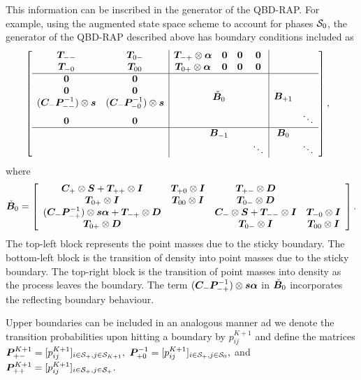 This information can be inscribed in the generator of the QBD-RAP. For example, using the augmented state space scheme to account for phases \(\mathcal{S}_0\), the generator of the QBD-RAP described above has boundary conditions included as 
\begin{align*}
&\left[\begin{array}{cc|cccc|cc}
	\bs T_{--} & \bs T_{0-} & \bs T_{-+} \otimes\bs \alpha & \bs 0 & \bs 0 & \bs 0 &&\\
	\bs T_{-0} & \bs T_{00} & \bs T_{0+} \otimes\bs \alpha & \bs 0 & \bs 0 & \bs 0 &&\\\hline
	\bs 0 & \bs 0 &\multicolumn{4}{c|}{\multirow{4}{*}{$\check{\bs B}_{0}$}} & \multirow{4}{*}{$\bs B_{+1}$}& \\
	\bs 0 & \bs 0 & \multicolumn{4}{c|}{} & &\\
	(\bs C_-\bs P_{--}^{-1})\otimes \bs s &(\bs C_-\bs P_{-0}^{-1}) \otimes \bs s & \multicolumn{4}{c|}{} &&\\
	\bs 0 & \bs 0 & \multicolumn{4}{c|}{} && \ddots\\ \hline
	& & \multicolumn{4}{c|}{\bs B_{-1}} & \bs B_0 &\\
	& & \multicolumn{3}{c}{}& \ddots &  & \ddots
	\end{array}\right],
\end{align*}
where 
\[\check{\boldsymbol B}_{0} = \left[\begin{array}{cccc}
	 \boldsymbol{C}_+\otimes \boldsymbol{S} + \boldsymbol{T}_{++}\otimes \boldsymbol{I} & \boldsymbol{T}_{+0}\otimes \boldsymbol{I} & \boldsymbol{T}_{+-}\otimes \boldsymbol{D} & \\
	 \boldsymbol{T}_{0+}\otimes \boldsymbol{I} & \boldsymbol{T}_{00}\otimes \boldsymbol{I} & \boldsymbol{T}_{0-}\otimes \boldsymbol{D} & \\
	 (\boldsymbol C_-\boldsymbol P_{-+}^{-1})\otimes \boldsymbol s \boldsymbol \alpha + \boldsymbol T_{-+}\otimes \boldsymbol D  &  & \boldsymbol{C}_-\otimes \boldsymbol{S} + \boldsymbol{T}_{--}\otimes \boldsymbol{I} & \boldsymbol{T}_{-0}\otimes \boldsymbol{I} \\
	 \boldsymbol{T}_{0+}\otimes \boldsymbol{D} & & \boldsymbol{T}_{0-}\otimes \boldsymbol{I} & \boldsymbol{T}_{00}\otimes \boldsymbol{I} 
	\end{array}\right].\]
The top-left block represents the point masses due to the sticky boundary. The bottom-left block is the transition of density into point masses due to the sticky boundary. The top-right block is the transition of point masses into density as the process leaves the boundary. The term \((\boldsymbol C_-\boldsymbol P_{-+}^{-1})\otimes \boldsymbol s \boldsymbol \alpha\) in \(\check{\boldsymbol B}_{0}\) incorporates the reflecting boundary behaviour.

Upper boundaries can be included in an analogous manner ad we denote the transition probabilities upon hitting a boundary by \(p_{ij}^{K+1}\) and define the matrices \(\boldsymbol P_{+-}^{K+1} = [p_{ij}^{K+1}]_{i\in\mathcal{S}_+,j\in\mathcal{S}_{K+1}},\) \(\boldsymbol P_{+0}^{-1} = [p_{ij}^{K+1}]_{i\in\mathcal{S}_+,j\in\mathcal{S}_0},\) and \(\boldsymbol P_{++}^{K+1} = [p_{ij}^{K+1}]_{i\in\mathcal{S}_+,j\in\mathcal{S}_+}.\) 

